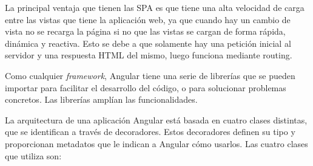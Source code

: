 \documentclass[a4paper, 12pt]{book}
\begin{document}
La principal ventaja que tienen las SPA es que tiene una alta velocidad de carga entre las vistas que tiene la aplicación web, ya que cuando hay un cambio de vista no se recarga la página si no que las vistas se cargan de forma rápida, dinámica y reactiva. 
Esto se debe a que solamente hay una petición inicial al servidor y una respuesta HTML del mismo, luego funciona mediante routing.

Como cualquier \emph{framework}, Angular tiene una serie de librerías que se pueden importar para facilitar el desarrollo del código, o para solucionar problemas concretos. 
Las librerías amplían las funcionalidades.

La arquitectura de una aplicación Angular está basada en cuatro clases distintas, que se identifican a través de decoradores. 
Estos decoradores definen su tipo y proporcionan metadatos que le indican a Angular cómo usarlos.
Las cuatro clases que utiliza son:
\end{document}

